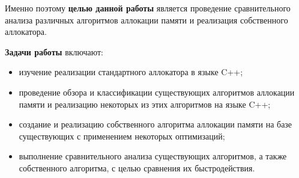 Именно поэтому \textbf{целью данной работы} является проведение сравнительного анализа различных алгоритмов аллокации памяти и реализация собственного аллокатора. 

\textbf{Задачи работы} включают:
\begin{itemize}
	\item изучение реализации стандартного аллокатора в языке C++;
	\item проведение обзора и классификации существующих алгоритмов аллокации памяти и реализацию некоторых из этих алгоритмов на языке C++;
	\item создание и реализацию собственного алгоритма аллокации памяти на базе существующих с применением некоторых оптимизаций;
	\item выполнение сравнительного анализа существующих алгоритмов, а также собственного алгоритма, с целью сравнения их быстродействия.
\end{itemize}
